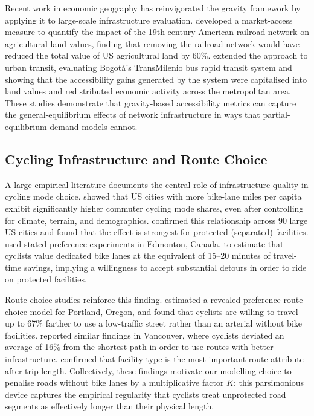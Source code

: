 \documentclass[12pt,a4paper]{article}
\begin{document}
Recent work in economic geography has reinvigorated the gravity framework by applying it to large-scale infrastructure evaluation. \citet{donaldson2016railroads} developed a market-access measure to quantify the impact of the 19th-century American railroad network on agricultural land values, finding that removing the railroad network would have reduced the total value of US agricultural land by 60\%. \citet{tsivanidis2024evaluating} extended the approach to urban transit, evaluating Bogot\'{a}'s TransMilenio bus rapid transit system and showing that the accessibility gains generated by the system were capitalised into land values and redistributed economic activity across the metropolitan area. These studies demonstrate that gravity-based accessibility metrics can capture the general-equilibrium effects of network infrastructure in ways that partial-equilibrium demand models cannot.

\subsection{Cycling Infrastructure and Route Choice}

A large empirical literature documents the central role of infrastructure quality in cycling mode choice. \citet{dill2003bicycle} showed that US cities with more bike-lane miles per capita exhibit significantly higher commuter cycling mode shares, even after controlling for climate, terrain, and demographics. \citet{buehler2012cycling} confirmed this relationship across 90 large US cities and found that the effect is strongest for protected (separated) facilities. \citet{hunt2007influences} used stated-preference experiments in Edmonton, Canada, to estimate that cyclists value dedicated bike lanes at the equivalent of 15--20 minutes of travel-time savings, implying a willingness to accept substantial detours in order to ride on protected facilities.

Route-choice studies reinforce this finding. \citet{broach2012bicycle} estimated a revealed-preference route-choice model for Portland, Oregon, and found that cyclists are willing to travel up to 67\% farther to use a low-traffic street rather than an arterial without bike facilities. \citet{winters2010far} reported similar findings in Vancouver, where cyclists deviated an average of 16\% from the shortest path in order to use routes with better infrastructure. \citet{stinson2003commuter} confirmed that facility type is the most important route attribute after trip length. Collectively, these findings motivate our modelling choice to penalise roads without bike lanes by a multiplicative factor $K$: this parsimonious device captures the empirical regularity that cyclists treat unprotected road segments as effectively longer than their physical length.
\end{document}
